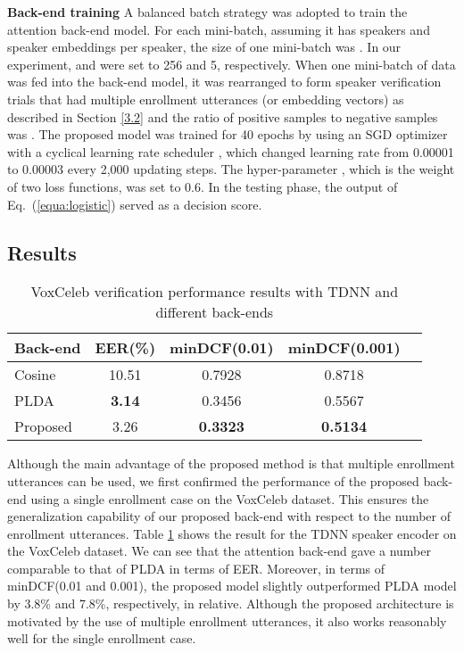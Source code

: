 \documentclass{article}
\begin{document}
\noindent
\textbf{Back-end training}
A balanced batch strategy was adopted to train the attention back-end model. For each mini-batch, assuming it has  speakers and  speaker embeddings per speaker, the size of one mini-batch was . In our experiment,  and  were set to 256 and 5, respectively. When one mini-batch of data was fed into the back-end model, it was rearranged to form speaker verification trials that had multiple enrollment utterances (or embedding vectors) as described in Section \ref{3.2} and the ratio of positive samples to negative samples was . The proposed model was trained for 40 epochs by using an SGD optimizer with a cyclical learning rate scheduler \cite{cyclic}, which changed learning rate from 0.00001 to 0.00003 every 2,000 updating steps. The hyper-parameter , which is the weight of two loss functions, was set to 0.6. In the testing phase, the output of Eq.\ (\ref{equa:logistic}) served as a decision score.
\vspace{-1mm}




\subsection{Results}
\vspace{-1mm}

\begin{table}[t]
\vspace{-2mm}
\footnotesize
  \caption{VoxCeleb verification performance results with TDNN and different back-ends}
  \label{tab:result_vox}
  \vspace{1mm}
  \centering
  \begin{tabular}{lcccc}
    \toprule
    \textbf{Back-end} & \textbf{EER(\%)} & \textbf{minDCF(0.01)} & \textbf{minDCF(0.001)} \\
    \midrule
    Cosine     & 10.51              & 0.7928                & 0.8718                    \\
    PLDA       & \textbf{3.14}      & 0.3456                & 0.5567                    \\
    Proposed   & 3.26               & \textbf{0.3323}       & \textbf{0.5134}           \\
    \bottomrule
  \end{tabular}
  \vspace{-5mm}
\end{table}

Although the main advantage of the proposed method is that multiple enrollment utterances can be used, we first confirmed the performance of the proposed back-end using a single enrollment case on the VoxCeleb dataset. This ensures the generalization capability of our proposed back-end with respect to the number of enrollment utterances. Table \ref{tab:result_vox} shows the result for the TDNN speaker encoder on the VoxCeleb dataset. We can see that the attention back-end gave a number comparable to that of PLDA in terms of EER. Moreover, in terms of minDCF(0.01 and 0.001), the proposed model slightly outperformed PLDA model by 3.8\% and 7.8\%, respectively, in relative. Although the proposed architecture is motivated by the use of multiple enrollment utterances, it also works reasonably well for the single enrollment case. 
\end{document}
